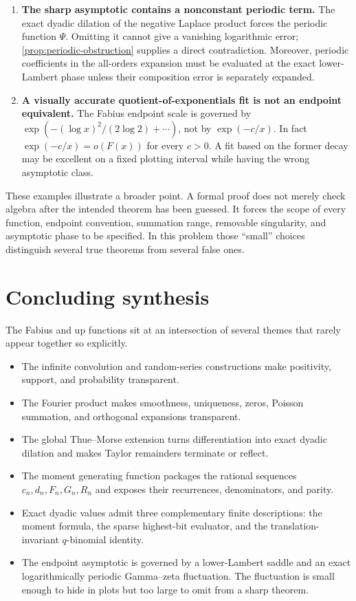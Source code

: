 \documentclass[11pt]{article}
\numberwithin{equation}{section}
\theoremstyle{definition}
\theoremstyle{remark}
\begin{document}
\begin{enumerate}[label=\textbf{\arabic*.},leftmargin=*]
\item \textbf{The sharp asymptotic contains a nonconstant periodic term.}
The exact dyadic dilation of the negative Laplace product forces the
periodic function $\Psi$.  Omitting it cannot give a vanishing logarithmic
error; \cref{prop:periodic-obstruction} supplies a direct contradiction.
Moreover, periodic coefficients in the all-orders expansion must be evaluated
at the exact lower-Lambert phase unless their composition error is separately
expanded.

\item \textbf{A visually accurate quotient-of-exponentials fit is not an
endpoint equivalent.}
The Fabius endpoint scale is governed by
$\exp(-({\log x})^2/(2\log2)+\cdots)$, not by $\exp(-c/x)$.  In fact
$\exp(-c/x)=o(F(x))$ for every $c>0$.  A fit based on the former decay may be
excellent on a fixed plotting interval while having the wrong asymptotic
class.
\end{enumerate}

These examples illustrate a broader point.  A formal proof does not merely
check algebra after the intended theorem has been guessed.  It forces the
scope of every function, endpoint convention, summation range, removable
singularity, and asymptotic phase to be specified.  In this problem those
``small'' choices distinguish several true theorems from several false ones.

\section{Concluding synthesis}\label{sec:conclusion}

The Fabius and up functions sit at an intersection of several themes that
rarely appear together so explicitly.

\begin{itemize}[leftmargin=*]
\item The infinite convolution and random-series constructions make
positivity, support, and probability transparent.
\item The Fourier product makes smoothness, uniqueness, zeros, Poisson
summation, and orthogonal expansions transparent.
\item The global Thue--Morse extension turns differentiation into exact
dyadic dilation and makes Taylor remainders terminate or reflect.
\item The moment generating function packages the rational sequences
$c_n,d_n,F_n,G_n,R_n$ and exposes their recurrences, denominators, and parity.
\item Exact dyadic values admit three complementary finite descriptions: the
moment formula, the sparse highest-bit evaluator, and the translation-invariant
$q$-binomial identity.
\item The endpoint asymptotic is governed by a lower-Lambert saddle and an
exact logarithmically periodic Gamma--zeta fluctuation.  The fluctuation is
small enough to hide in plots but too large to omit from a sharp theorem.
\end{itemize}
\end{document}
